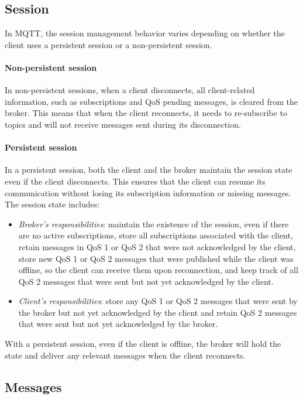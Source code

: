 \subsection{Session}
In MQTT, the session management behavior varies depending on whether the client uses a persistent session or a non-persistent session.

\paragraph*{Non-persistent session}
In non-persistent sessions, when a client disconnects, all client-related information, such as subscriptions and QoS pending messages, is cleared from the broker. 
This means that when the client reconnects, it needs to re-subscribe to topics and will not receive messages sent during its disconnection.

\paragraph*{Persistent session}
In a persistent session, both the client and the broker maintain the session state even if the client disconnects. 
This ensures that the client can resume its communication without losing its subscription information or missing messages. 
The session state includes:
\begin{itemize}
    \item \textit{Broker's responsibilities}: maintain the existence of the session, even if there are no active subscriptions, store all subscriptions associated with the client, retain messages in QoS 1 or QoS 2 that were not acknowledged by the client, store new QoS 1 or QoS 2 messages that were published while the client was offline, so the client can receive them upon reconnection, and keep track of all QoS 2 messages that were sent but not yet acknowledged by the client.
    \item \textit{Client's responsibilities}: store any QoS 1 or QoS 2 messages that were sent by the broker but not yet acknowledged by the client and retain QoS 2 messages that were sent but not yet acknowledged by the broker.
\end{itemize}
With a persistent session, even if the client is offline, the broker will hold the state and deliver any relevant messages when the client reconnects. 

\subsection{Messages}
